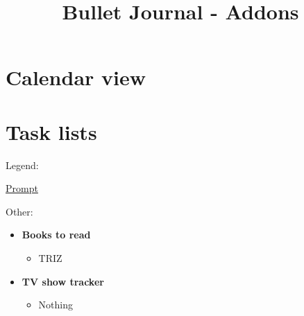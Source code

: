 \documentclass[a4paper]{article}
\title{Bullet Journal - Addons}
\begin{document}
\maketitle
\tableofcontents
\newpage
	\section{Calendar view}
	
\newpage
\section{Task lists}
Legend:
\begin{itemize}
	 [+] \href{https://bulletjournal.com/blogs/bulletjournalist/long-form-journaling}{Prompt}
\end{itemize}
Other:
\begin{itemize}
	\item \textbf{Books to read}
    \begin{itemize}
        \item TRIZ
    \end{itemize}
\end{itemize}
\begin{itemize}
	\item \textbf{TV show tracker}
    \begin{itemize}
        \item Nothing
    \end{itemize}
	\end{itemize}
\end{document}
